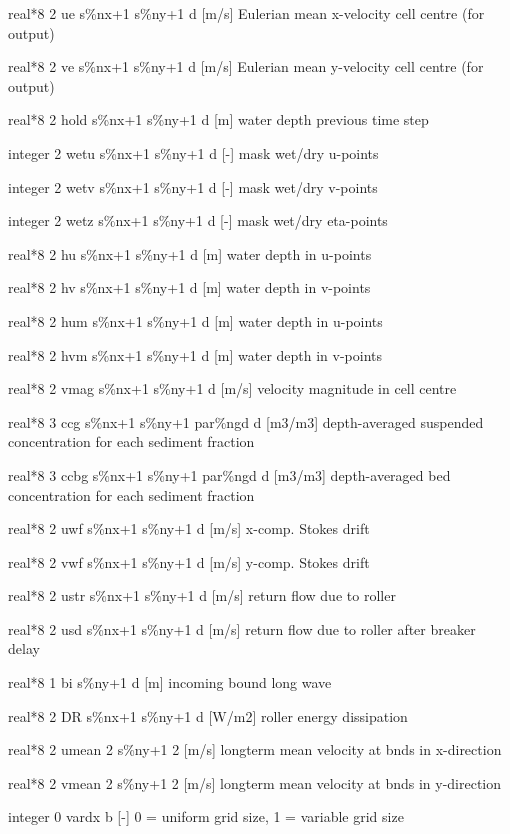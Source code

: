 real*8  2  ue     s\%nx+1 s\%ny+1 d  [m/s]      Eulerian mean x-velocity cell centre (for output)

real*8  2  ve     s\%nx+1 s\%ny+1 d  [m/s]      Eulerian mean y-velocity cell centre (for output)

real*8  2  hold   s\%nx+1 s\%ny+1 d  [m]        water depth previous time step

integer 2  wetu   s\%nx+1 s\%ny+1 d  [-]        mask wet/dry u-points

integer 2  wetv   s\%nx+1 s\%ny+1 d  [-]        mask wet/dry v-points

integer 2  wetz   s\%nx+1 s\%ny+1 d  [-]        mask wet/dry eta-points

real*8  2  hu     s\%nx+1 s\%ny+1 d  [m]        water depth in u-points

real*8  2  hv     s\%nx+1 s\%ny+1 d  [m]        water depth in v-points

real*8  2  hum    s\%nx+1 s\%ny+1 d  [m]        water depth in u-points

real*8  2  hvm    s\%nx+1 s\%ny+1 d  [m]        water depth in v-points

real*8  2  vmag   s\%nx+1 s\%ny+1 d  [m/s]      velocity magnitude in cell centre

real*8  3  ccg    s\%nx+1 s\%ny+1 par\%ngd d  [m3/m3]    depth-averaged suspended concentration for each sediment fraction

real*8  3  ccbg   s\%nx+1 s\%ny+1 par\%ngd d  [m3/m3]    depth-averaged bed concentration for each sediment fraction

real*8  2  uwf    s\%nx+1 s\%ny+1 d  [m/s]      x-comp. Stokes drift

real*8  2  vwf    s\%nx+1 s\%ny+1 d  [m/s]      y-comp. Stokes drift

real*8  2  ustr   s\%nx+1 s\%ny+1 d  [m/s]      return flow due to roller

real*8  2  usd    s\%nx+1 s\%ny+1 d  [m/s]      return flow due to roller after breaker delay

real*8  1  bi     s\%ny+1 d  [m]        incoming bound long wave

real*8  2  DR     s\%nx+1 s\%ny+1 d  [W/m2]     roller energy dissipation

real*8  2  umean  2 s\%ny+1 2  [m/s]      longterm mean velocity at bnds in x-direction

real*8  2  vmean  2 s\%ny+1 2  [m/s]      longterm mean velocity at bnds in y-direction

integer 0  vardx  b  [-]        0 = uniform grid size, 1 = variable grid size

